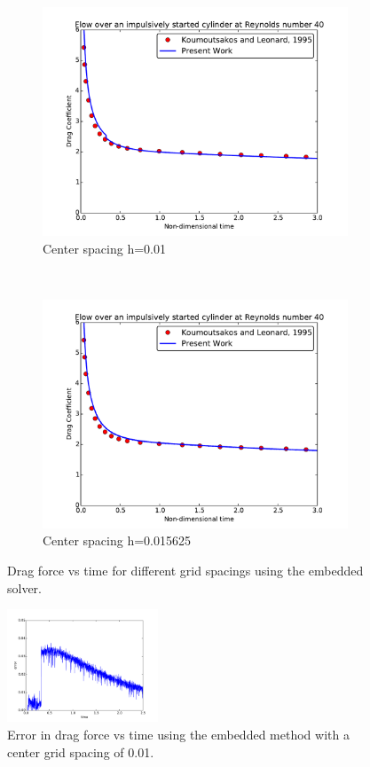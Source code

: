 \begin{figure}[!htb]
	\centering
	\begin{subfigure}{0.4\textwidth}
		\includegraphics[width=\linewidth]{embedded01}
		\caption{Center spacing h=0.01}
	\end{subfigure}
	~
	\begin{subfigure}{0.4\textwidth}
		\includegraphics[width=\linewidth]{embedded015625}
		\caption{Center spacing h=0.015625}
	\end{subfigure}
	\caption{Drag force vs time for different grid spacings using the embedded solver.}
	\label{fig:embedded005}
\end{figure}
\begin{figure}[!htb]
	\centering
	\includegraphics[width=0.4\textwidth]{embedded_error_01}
	\caption{Error in drag force vs time using the embedded method with a center grid spacing of 0.01.}
	\label{fig:embeddederror005}
\end{figure}

